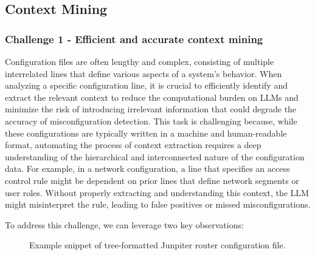 \subsection{Context Mining}\label{mining_method}
\subsubsection{Challenge 1 - Efficient and accurate context mining}
\label{challenge_1}
Configuration files are often lengthy and complex, consisting of multiple interrelated lines that define various aspects of a system's behavior. When analyzing a specific configuration line, it is crucial to efficiently identify and extract the relevant context to reduce the computational burden on LLMs and minimize the risk of introducing irrelevant information that could degrade the accuracy of misconfiguration detection. This task is challenging because, while these configurations are typically written in a machine and human-readable format, automating the process of context extraction requires a deep understanding of the hierarchical and interconnected nature of the configuration data. For example, in a network configuration, a line that specifies an access control rule might be dependent on prior lines that define network segments or user roles. Without properly extracting and understanding this context, the LLM might misinterpret the rule, leading to false positives or missed misconfigurations.

 To address this challenge, we can leverage two key observations:
\begin{figure}[t]
    \centering
    \caption{Example snippet of tree-formatted Junpiter router configuration file.}
    \label{fig:tree}
\end{figure}

